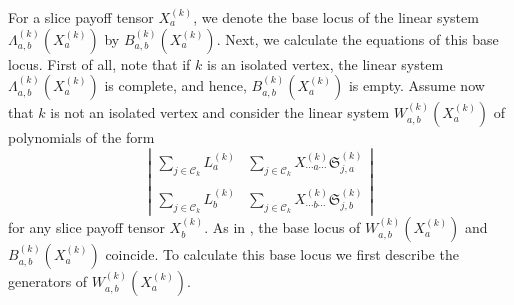 \documentclass[11pt]{amsart}
\numberwithin{equation}{section}
\theoremstyle{plain}
\numberwithin{theorem}{section}
\theoremstyle{definition}
\begin{document}
\noindent For a slice payoff tensor $X_a^{(k)}$, we denote the base locus of the linear system $\Lambda_{a,b}^{(k)}(X^{(k)}_a)$ by $B_{a,b}^{(k)}(X^{(k)}_a)$. 
Next, we calculate the equations of this base locus. First of all, note that if $k$ is an isolated vertex, the linear system $\Lambda_{a,b}^{(k)}(X^{(k)}_a)$ is complete, and hence, $B_{a,b}^{(k)}(X^{(k)}_a)$ is empty. Assume now that $k$ is not an isolated vertex and consider the linear system $W_{a,b}^{(k)}(X^{(k)}_a)$ of polynomials  of the form 
\begin{equation}\label{eq:det linear sys}
\left|\begin{matrix}
    \displaystyle\sum_{j\in\mathscr C_k}L_a^{(k)}&\displaystyle\sum_{j\in\mathscr C_k}X_{\cdots a\cdots}^{(k)}\mathfrak S_{j,a}^{(k)}\\
    &\\
    \displaystyle\sum_{j\in\mathscr C_k}L_b^{(k)}  &\displaystyle\sum_{j\in\mathscr C_k}X_{\cdots b\cdots}^{(k)}\mathfrak S_{j,b}^{(k)}
\end{matrix}\right|
\end{equation}
for any slice payoff tensor $X^{(k)}_b$.
As in \cite[Section 3]{portakal2024game}, the base locus of $W_{a,b}^{(k)}(X^{(k)}_a)$ and $B_{a,b}^{(k)}(X^{(k)}_a)$ coincide. To calculate this base locus we first describe the generators of $W_{a,b}^{(k)}(X^{(k)}_a)$.
\end{document}
